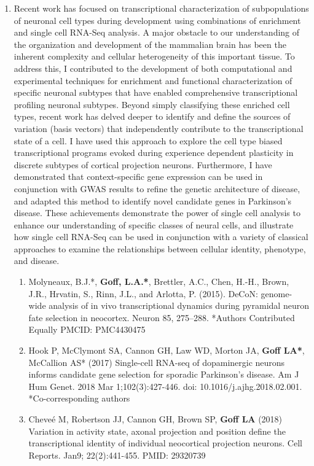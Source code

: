 \documentclass{nihbiosketch}
\begin{document}
\begin{enumerate}
\item Recent work has focused on transcriptional characterization of subpopulations of neuronal cell types during development using combinations of enrichment and single cell RNA-Seq analysis. A major obstacle to our understanding of the organization and development of the mammalian brain has been the inherent complexity and cellular heterogeneity of this important tissue. To address this, I contributed to the development of both computational and experimental techniques for enrichment and functional characterization of specific neuronal subtypes that have enabled comprehensive transcriptional profiling neuronal subtypes. Beyond simply classifying these enriched cell types, recent work has delved deeper to identify and define the sources of variation (basis vectors) that independently contribute to the transcriptional state of a cell. I have used this approach to explore the cell type biased transcriptional programs evoked during experience dependent plasticity in discrete subtypes of cortical projection neurons. Furthermore, I have demonstrated that context-specific gene expression can be used in conjunction with GWAS results to refine the genetic architecture of disease, and adapted this method to identify novel candidate genes in Parkinson's disease. These achievements demonstrate the power of single cell analysis to enhance our understanding of specific classes of neural cells, and illustrate how single cell RNA-Seq can be used in conjunction with a variety of classical approaches to examine the relationships between cellular identity, phenotype, and disease.

\begin{enumerate}
\item	Molyneaux, B.J.*, \textbf{Goff, L.A.*}, Brettler, A.C., Chen, H.-H., Brown, J.R., Hrvatin, S., Rinn, J.L., and Arlotta, P. (2015). DeCoN: genome-wide analysis of in vivo transcriptional dynamics during pyramidal neuron fate selection in neocortex. Neuron 85, 275–288. *Authors Contributed Equally PMCID: PMC4430475

\item	Hook P, McClymont SA, Cannon GH, Law WD, Morton JA, \textbf{Goff LA*}, McCallion AS* (2017) Single-cell RNA-seq of dopaminergic neurons informs candidate gene selection for sporadic Parkinson's disease. Am J Hum Genet. 2018 Mar 1;102(3):427-446. doi: 10.1016/j.ajhg.2018.02.001. *Co-corresponding authors

\item	Cheveé M, Robertson JJ, Cannon GH, Brown SP, \textbf{Goff LA }(2018) Variation in activity state, axonal projection and position define the transcriptional identity of individual neocortical projection neurons. Cell Reports. Jan9; 22(2):441-455. PMID: 29320739


\end{enumerate}
\end{enumerate}
\end{document}
